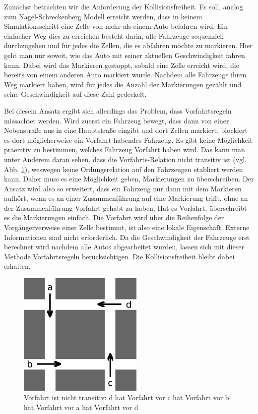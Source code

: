 \documentclass[11pt, a4paper]{article}
\begin{document}
Zunächst betrachten wir die Anforderung der Kollisionsfreiheit. Es soll, analog zum Nagel-Schreckenberg Modell \cite{nagel-schreckenberg} erreicht werden, dass in keinem Simulationsschritt eine Zelle von mehr als einem Auto befahren wird. Ein einfacher Weg dies zu erreichen besteht darin, alle Fahrzeuge sequenziell durchzugehen und für jedes die Zellen, die es abfahren möchte zu markieren. Hier geht man nur soweit, wie das Auto mit seiner aktuellen Geschwindigkeit fahren kann. Dabei wird das Markieren gestoppt, sobald eine Zelle erreicht wird, die bereits von einem anderen Auto markiert wurde. Nachdem alle Fahrzeuge ihren Weg markiert haben, wird für jedes die Anzahl der Markierungen gezählt und seine Geschwindigkeit auf diese Zahl gedeckelt.

Bei diesem Ansatz ergibt sich allerdings das Problem, dass Vorfahrtsregeln missachtet werden. Wird zuerst ein Fahrzeug bewegt, dass dann von einer Nebenstraße aus in eine Hauptstraße eingibt und dort Zellen markiert, blockiert es dort möglicherweise ein Vorfahrt habendes Fahrzeug. Es gibt keine Möglichkeit präemtiv zu bestimmen, welches Fahrzeug Vorfahrt haben wird. Das kann man unter Anderem daran sehen, dass die Vorfahrts-Relation nicht transitiv ist (vgl. Abb. \ref{fig:rightOfWayNotTransitive}), weswegen keine Ordungsrelation auf den Fahrzeugen etabliert werden kann. Daher muss es eine Möglichkeit geben, Markierungen zu überschreiben. Der Ansatz wird also so erweitert, dass ein Fahrzeug nur dann mit dem Markieren aufhört, wenn es an einer Zusammenführung auf eine Markierung trifft, ohne an der Zusammenführung Vorfahrt gehabt zu haben. Hat es Vorfahrt, überschreibt es die Markierungen einfach. Die Vorfahrt wird über die Reihenfolge der Vorgängerverweise einer Zelle bestimmt, ist also eine lokale Eigenschaft. Externe Informationen sind nicht erforderlich. Da die Geschwindigkeit der Fahrzeuge erst berechnet wird nachdem alle Autos abgearbeitet wurden, lassen sich mit dieser Methode Vorfahrtsregeln berücksichtigen. Die Kollisionsfreiheit bleibt dabei erhalten.
\begin{figure}[h!]
	\centering
	\includegraphics[width=6cm]{img/rightOfWay}
	\caption{Vorfahrt ist nicht transitiv: d hat Vorfahrt vor c hat Vorfahrt vor b hat Vorfahrt vor a hat Vorfahrt vor d}
	\label{fig:rightOfWayNotTransitive}
\end{figure}
\end{document}
